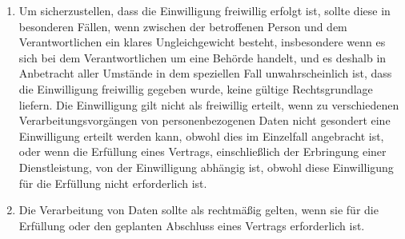 \begin{enumerate}

   \item Um sicherzustellen, dass die Einwilligung freiwillig erfolgt ist, sollte diese in besonderen Fällen, wenn
    zwischen der betroffenen Person und dem Verantwortlichen ein klares Ungleichgewicht besteht, insbesondere wenn es
    sich bei dem Verantwortlichen um eine Behörde handelt, und es deshalb in Anbetracht aller Umstände in dem
    speziellen Fall unwahrscheinlich ist, dass die Einwilligung freiwillig gegeben wurde, keine gültige Rechtsgrundlage
    liefern. Die Einwilligung gilt nicht als freiwillig erteilt, wenn zu verschiedenen Verarbeitungsvorgängen von
    personenbezogenen Daten nicht gesondert eine Einwilligung erteilt werden kann, obwohl dies im Einzelfall angebracht
    ist, oder wenn die Erfüllung eines Vertrags, einschließlich der Erbringung einer Dienstleistung, von der
    Einwilligung abhängig ist, obwohl diese Einwilligung für die Erfüllung nicht erforderlich ist.%
   \label{itm:eg-43}
   

   \item Die Verarbeitung von Daten sollte als rechtmäßig gelten, wenn sie für die Erfüllung oder den geplanten
    Abschluss eines Vertrags erforderlich ist.%
   \label{itm:eg-44}
   


\end{enumerate}
